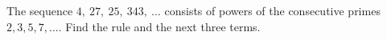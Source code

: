 The sequence $4,\ 27,\ 25,\ 343,\ \dots$ consists of powers of the consecutive primes $2,3,5,7,\dots$. Find the rule and the next three terms.
